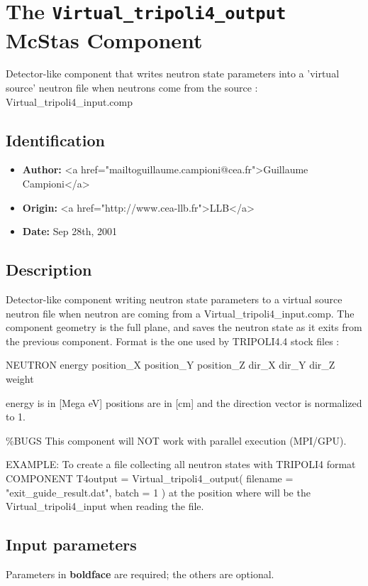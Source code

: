 \section{The \texttt{Virtual\_tripoli4\_output} McStas Component}
Detector-like component that writes neutron state parameters into a
'virtual source' neutron file when neutrons come from the source :
Virtual\_tripoli4\_input.comp

\subsection*{Identification}
\begin{itemize}
  \item \textbf{Author:} \textless{}a href="mailtoguillaume.campioni@cea.fr"\textgreater{}Guillaume Campioni\textless{}/a\textgreater{}
  \item \textbf{Origin:} \textless{}a href="http://www.cea-llb.fr"\textgreater{}LLB\textless{}/a\textgreater{}
  \item \textbf{Date:} Sep 28th, 2001
\end{itemize}

\subsection*{Description}
Detector-like component writing neutron state parameters to a virtual source neutron file when neutron are coming from a Virtual\_tripoli4\_input.comp. The component geometry is the full plane, and saves the neutron state as it exits from the previous component. Format is the one used by TRIPOLI4.4 stock files :

NEUTRON energy position\_X position\_Y position\_Z dir\_X dir\_Y dir\_Z weight

energy is in [Mega eV] positions are in [cm] and the direction vector is normalized to 1.

\%BUGS This component will NOT work with parallel execution (MPI/GPU).

EXAMPLE: To create a file collecting all neutron states with TRIPOLI4 format COMPONENT T4output = Virtual\_tripoli4\_output( filename = "exit\_guide\_result.dat", batch = 1 ) at the position where will be the Virtual\_tripoli4\_input when reading the file.

\subsection*{Input parameters}
Parameters in \textbf{boldface} are required; the others are optional.

